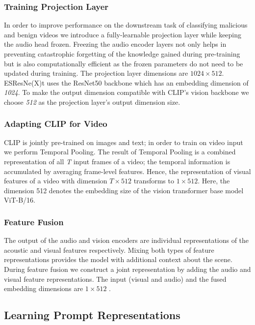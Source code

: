 \documentclass[letterpaper]{article}
\begin{document}
\subsubsection{Training Projection Layer}\label{projlayerlabel}
In order to improve performance on the downstream task of classifying malicious and benign videos we introduce a fully-learnable projection layer while keeping the audio head frozen. Freezing the audio encoder layers not only helps in preventing catastrophic forgetting of the knowledge gained during pre-training but is also computationally efficient as the frozen parameters do not need to be updated during training. The projection layer dimensions are \textit{$1024 \times 512$}. ESResNe(X)t uses the ResNet50 backbone \cite{resnet50} which has an embedding dimension of \textit{1024}.  To make the output dimension compatible with CLIP's vision backbone we choose \textit{512} as the projection layer's output dimension size.

\subsubsection{Adapting CLIP for Video}
CLIP is jointly pre-trained on images and text; in order to train on video input we perform Temporal Pooling. The result of Temporal Pooling is a combined representation of all \textit{T} input frames of a video; the temporal information is accumulated by averaging frame-level features. Hence, the representation of visual features of a video with dimension \textit{$T \times 512$} transforms to \textit{$1 \times 512$}. 
Here, the dimension 512 denotes the embedding size of the vision transformer base model ViT-B/16. 

\subsubsection{Feature Fusion}
The output of the audio and vision encoders are individual representations of the acoustic and visual features respectively. Mixing both types of feature representations provides the model with additional context about the scene. During feature fusion we construct a joint representation by adding the audio and visual feature representations. The input (visual and audio) and the fused embedding dimensions are \textit{$1 \times 512$} .

\subsection{Learning Prompt Representations}\label{promptlearninglabel}
\end{document}
